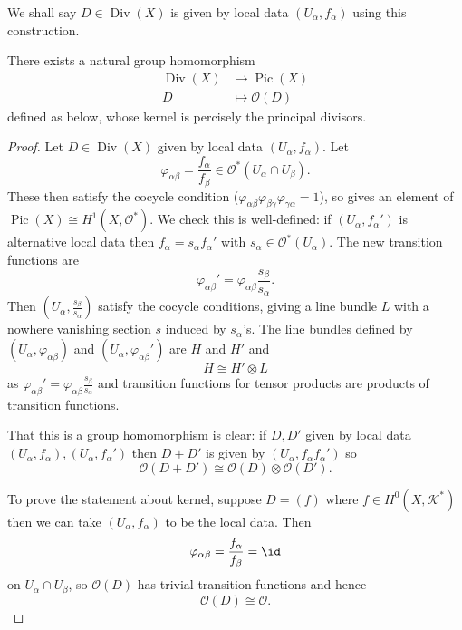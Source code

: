 \documentclass[a4paper]{article}
\DeclareMathOperator{\Pic}{Pic} %
\DeclareMathOperator{\Div}{Div} %
\begin{document}
We shall say \(D \in \Div(X)\) is given by local data \((U_\alpha, f_\alpha)\) using this construction.

\begin{theorem}
  There exists a natural group homomorphism
  \begin{align*}
    \Div(X) &\to \Pic(X) \\
    D &\mapsto \mathcal O(D)
  \end{align*}
  defined as below, whose kernel is percisely the principal divisors.
\end{theorem}

\begin{proof}
  Let \(D \in \Div(X)\) given by local data \((U_\alpha, f_\alpha)\). Let
  \[
    \varphi_{\alpha\beta} = \frac{f_\alpha}{f_\beta} \in \mathcal O^*(U_\alpha \cap U_\beta).
  \]
  These then satisfy the cocycle condition (\(\varphi_{\alpha\beta} \varphi_{\beta\gamma} \varphi_{\gamma\alpha} = 1\)), so gives an element of \(\Pic (X) \cong H^1(X, \mathcal O^*)\). We check this is well-defined: if \((U_\alpha, f_\alpha')\) is alternative local data then \(f_\alpha = s_\alpha f_\alpha'\) with \(s_\alpha \in \mathcal O^*(U_\alpha)\). The new transition functions are
  \[
    \varphi_{\alpha\beta}' = \varphi_{\alpha\beta} \frac{s_\beta}{s_\alpha}.
  \]
  Then \((U_\alpha, \frac{s_\beta}{s_\alpha})\) satisfy the cocycle conditions, giving a line bundle \(L\) with a nowhere vanishing section \(s\) induced by \(s_\alpha\)'s. The line bundles defined by \((U_\alpha, \varphi_{\alpha\beta})\) and \((U_\alpha, \varphi_{\alpha\beta}')\) are \(H\) and \(H'\) and
  \[
    H \cong H' \otimes L
  \]
  as \(\varphi_{\alpha\beta}' = \varphi_{\alpha\beta} \frac{s_\beta}{s_\alpha}\) and transition functions for tensor products are products of transition functions.

  That this is a group homomorphism is clear: if \(D, D'\) given by local data \((U_\alpha, f_\alpha), (U_\alpha, f_\alpha')\) then \(D + D'\) is given by \((U_\alpha, f_\alpha f_\alpha')\) so
  \[
    \mathcal O(D + D') \cong \mathcal O(D) \otimes \mathcal O(D').
  \]

  To prove the statement about kernel, suppose \(D = (f)\) where \(f \in H^0(X, \mathcal K^*)\) then we can take \((U_\alpha, f_\alpha)\) to be the local data. Then
  \[
    \varphi_{\alpha\beta} = \frac{f_\alpha}{f_\beta} = \id
  \]
  on \(U_\alpha \cap U_\beta\), so \(\mathcal O(D)\) has trivial transition functions and hence
  \[
    \mathcal O(D) \cong \mathcal O.
  \]


\end{proof}
\end{document}
